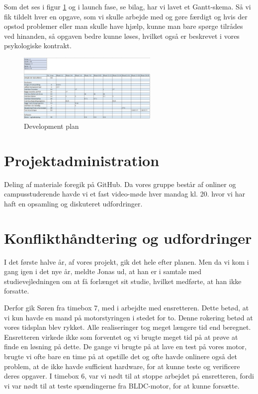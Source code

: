 Som det ses i figur \ref{fig:p1} og i launch fase, se bilag, har vi lavet et Gantt-skema. Så vi fik tildelt hver en opgave, som vi skulle arbejde med og gøre færdigt og hvis der opstod problemer eller man skulle have hjælp, kunne man bare spørge tilrådes ved hinanden, så opgaven bedre kunne løses, hvilket også er beskrevet i vores psykologiske kontrakt.

\begin{figure}[h]
  \centering
  \includegraphics[width=0.6\textwidth]{./figurer/p1.png}
  \caption{Development plan}
  \label{fig:p1}
\end{figure}


\section{Projektadministration}
\label{sec:proj-}

Deling af materiale foregik på GitHub.%
Da vores gruppe består af onliner og campusstuderende havde vi et fast video-møde hver mandag kl. 20. hvor vi har haft en opsamling og diskuteret udfordringer.

\section{Konflikthåndtering og udfordringer}
\label{sec:konfl-}

I det første halve år, af vores projekt, gik det hele efter planen. Men da vi kom i gang igen i det nye år, meldte Jonas ud, at han er i samtale med studievejledningen om at få forlænget sit studie, hvilket medførte, at han ikke forsatte. 

Derfor gik Søren fra timebox 7, med i arbejdte med ensretteren. Dette betød, at vi kun havde en mand på motorstyringen i stedet for to. Denne rokering betød at vores tidsplan blev rykket. Alle realiseringer tog meget længere tid end beregnet. Ensretteren virkede ikke som forventet og vi brugte meget tid på at prøve at finde en løsning på dette. De  gange vi brugte på at lave en test på vores motor, brugte vi ofte bare en time på at opstille det og ofte havde onlinere også det problem, at de ikke havde sufficient hardware, for at kunne teste og verificere deres opgaver.
I timebox 6, var vi nødt til at stoppe arbejdet på ensretteren, fordi vi var nødt til at teste spændingerne fra BLDC-motor, for at kunne forsætte.

